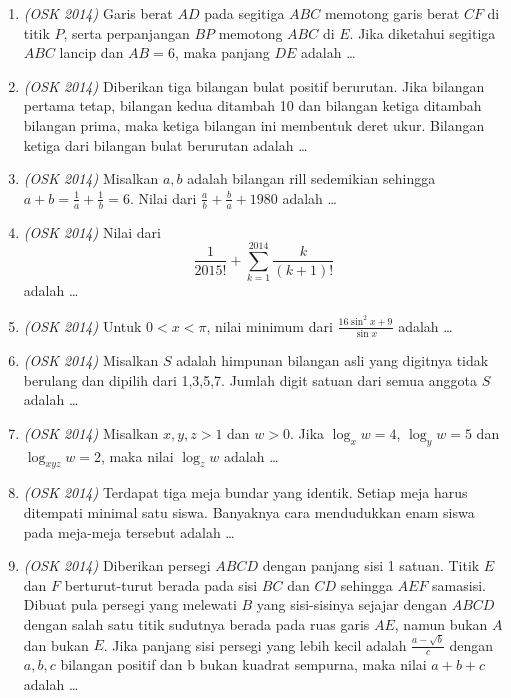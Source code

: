 \documentclass[11pt]{scrartcl}
\begin{document}
\begin{enumerate}
\item \textit{(OSK 2014)} Garis berat $AD$ pada segitiga $ABC$ memotong garis berat $CF$ di titik $P$, serta perpanjangan $BP$ memotong $ABC$ di $E$. Jika diketahui segitiga $ABC$ lancip dan $AB = 6$, maka panjang $DE$ adalah \dots

\item \textit{(OSK 2014)} Diberikan tiga bilangan bulat positif berurutan. Jika bilangan pertama tetap, bilangan kedua ditambah 10 dan bilangan ketiga ditambah bilangan prima, maka ketiga bilangan ini membentuk deret ukur. Bilangan ketiga dari bilangan bulat berurutan adalah \dots

\item \textit{(OSK 2014)} Misalkan $a,b$ adalah bilangan rill sedemikian sehingga $a+b = \frac{1}{a} + \frac{1}{b} = 6$. Nilai dari $\frac{a}{b} + \frac{b}{a} + 1980$ adalah \dots

\item \textit{(OSK 2014)} Nilai dari 
\[
\frac{1}{2015!} + \sum_{k=1}^{2014} \frac{k}{(k+1)!}
\]
adalah \dots

\item \textit{(OSK 2014)} Untuk $0 < x < \pi$, nilai minimum dari $\frac{16\sin^2 x + 9}{\sin x}$ adalah \dots

\item \textit{(OSK 2014)} Misalkan $S$ adalah himpunan bilangan asli yang digitnya tidak berulang dan dipilih dari 1,3,5,7. Jumlah digit satuan dari semua anggota $S$ adalah \dots

\item \textit{(OSK 2014)} Misalkan $x,y,z > 1$ dan $w > 0$. Jika $\log_x w = 4$, $\log_y w = 5$ dan $\log_{xyz} w = 2$, maka nilai $\log_z w$ adalah \dots

\item \textit{(OSK 2014)} Terdapat tiga meja bundar yang identik. Setiap meja harus ditempati minimal satu siswa. Banyaknya cara mendudukkan enam siswa pada meja-meja tersebut adalah \dots

\item \textit{(OSK 2014)} Diberikan persegi $ABCD$ dengan panjang sisi 1 satuan. Titik $E$ dan $F$ berturut-turut berada pada sisi $BC$ dan $CD$ sehingga $AEF$ samasisi. Dibuat pula persegi yang melewati $B$ yang sisi-sisinya sejajar dengan $ABCD$ dengan salah satu titik sudutnya berada pada ruas garis $AE$,  namun bukan $A$ dan bukan $E$. Jika panjang sisi persegi yang lebih kecil adalah $\frac{a - \sqrt{b}}{c}$ dengan $a,b,c$ bilangan positif dan b bukan kuadrat sempurna, maka nilai $a + b + c$ adalah \dots


\end{enumerate}
\end{document}
